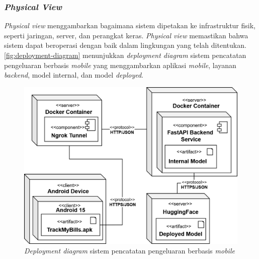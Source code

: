 \subsubsection{\emph{Physical View}}
\label{subsubsec:physical-view}
\emph{Physical view} menggambarkan bagaimana sistem dipetakan ke infrastruktur fisik, seperti jaringan, server, dan perangkat keras. \emph{Physical view} memastikan bahwa sistem dapat beroperasi dengan baik dalam lingkungan yang telah ditentukan. \autoref{fig:deployment-diagram} menunjukkan \emph{deployment diagram} sistem pencatatan pengeluaran berbasis \emph{mobile} yang menggambarkan aplikasi \emph{mobile}, layanan \emph{backend}, model internal, dan model \emph{deployed}.
\begin{figure}[htbp]
    \centering
    \includegraphics[width=1\textwidth]{images/deployment-diagram.png}
    \caption{\emph{Deployment diagram} sistem pencatatan pengeluaran berbasis \emph{mobile}}
    \label{fig:deployment-diagram}
\end{figure}